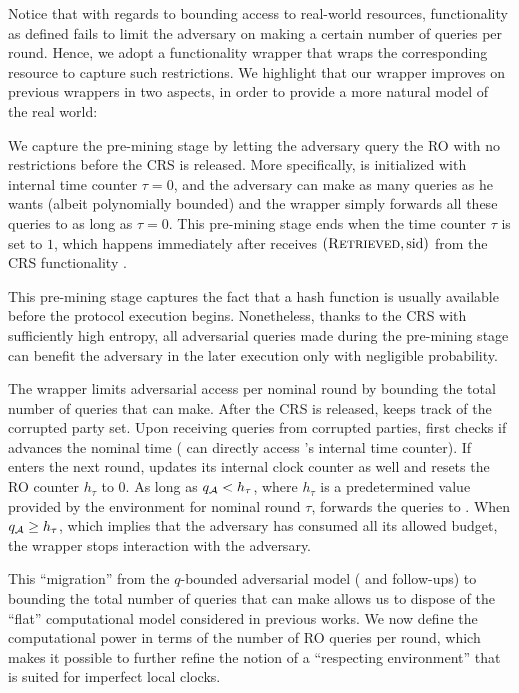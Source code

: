 Notice that with regards to bounding access to real-world resources, functionality \funcRO as defined fails to limit the adversary on making a certain number of queries per round.
%
Hence, we adopt a functionality wrapper \cite{C:BMTZ17,EC:GKOPZ20} \wrapper{\funcRO} that wraps the corresponding resource to capture such restrictions.
We highlight that our wrapper \wrapper{\funcRO} improves on previous wrappers in two aspects, in order to provide a more natural model of the real world:
%
\begin{cccItemize}[noitemsep]
      \item We capture the pre-mining stage by letting the adversary query the RO with no restrictions before the CRS is released.
      More specifically, \wrapper{\funcRO} is initialized with internal time counter $\tau = 0$, and the adversary can make as many queries as he wants (albeit polynomially bounded) and the wrapper simply forwards all these queries to \funcRO as long as $\tau = 0$.
      This pre-mining stage ends when the time counter $\tau$ is set to $1$, which happens immediately after \wrapper{\funcRO} receives $(\textsc{Retrieved}, \mathrm{sid})$ from the CRS functionality \funcCRS.

      This pre-mining stage captures the fact that a hash function is usually available before the protocol execution begins.
      Nonetheless, thanks to the CRS with sufficiently high entropy, all adversarial queries made during the pre-mining stage can benefit the adversary in the later execution only with negligible probability.

      \item The wrapper limits adversarial access per nominal round by bounding the total number of queries that \adv can make.
      After the CRS is released, \wrapper{\funcRO} keeps track of the corrupted party set.
      Upon receiving queries from corrupted parties, \wrapper{\funcRO} first checks if \funcImpClock advances the nominal time (\wrapper{\funcRO} can directly access \funcImpClock's internal time counter).
      If \funcImpClock enters the next round, \wrapper{\funcRO} updates its internal clock counter as well and resets the RO counter $h_\tau$
      to 0.
      As long as $q_\mathcal{A} < h_\tau$, where $h_\tau$ is a predetermined value provided by the environment \Z for nominal round $\tau$, \wrapper{\funcRO} forwards the queries to \funcRO.
      When $q_\mathcal{A} \ge h_\tau$, which implies that the adversary has
      consumed all its allowed budget, the wrapper stops interaction with
      the adversary.

      This ``migration'' from the $q$-bounded adversarial model (\cite{EC:GarKiaLeo15} and follow-ups) to bounding the total number of queries that \adv can make allows us to dispose of the ``flat'' computational model considered in previous works.
      We now define the computational power in terms of the number of RO queries per round, which makes it possible to further refine the notion of a ``respecting environment'' that is suited for imperfect local clocks.
\end{cccItemize}

